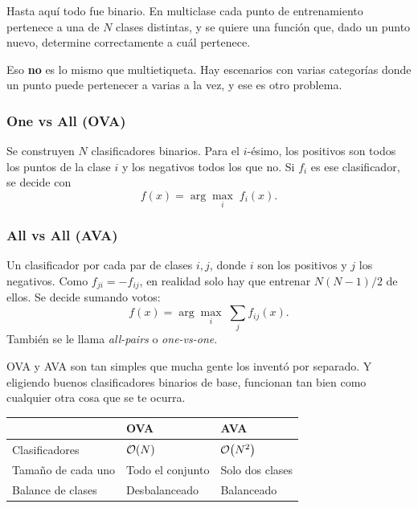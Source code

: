\documentclass[11pt,letterpaper]{article}
\begin{document}
Hasta aquí todo fue binario. En multiclase cada punto de entrenamiento
pertenece a una de $N$ clases distintas, y se quiere una función que,
dado un punto nuevo, determine correctamente a cuál pertenece.

\begin{ojo}
  Eso \textbf{no} es lo mismo que multietiqueta. Hay escenarios con
  varias categorías donde un punto puede pertenecer a varias a la vez,
  y ese es otro problema.
\end{ojo}

\subsubsection*{One vs All (OVA)}

Se construyen $N$ clasificadores binarios. Para el $i$-ésimo, los
positivos son todos los puntos de la clase $i$ y los negativos todos
los que no. Si $f_i$ es ese clasificador, se decide con
\[
    f(x) = \arg\max_{i} \; f_i(x) .
\]

\subsubsection*{All vs All (AVA)}

Un clasificador por cada par de clases $i, j$, donde $i$ son los
positivos y $j$ los negativos. Como $f_{ji} = -f_{ij}$, en realidad
solo hay que entrenar $N(N-1)/2$ de ellos. Se decide sumando votos:
\[
    f(x) = \arg\max_{i} \; \sum_{j} f_{ij}(x) .
\]
También se le llama \emph{all-pairs} o \emph{one-vs-one}.

\begin{idea}
  OVA y AVA son tan simples que mucha gente los inventó por separado.
  Y eligiendo buenos clasificadores binarios de base, funcionan tan
  bien como cualquier otra cosa que se te ocurra.
\end{idea}

\begin{center}
\begin{tabular}{lll}
    \toprule
     & \textbf{OVA} & \textbf{AVA} \\
    \midrule
    Clasificadores & $\mathcal{O}\!\left(N\right)$ & $\mathcal{O}\!\left(N^{2}\right)$ \\
    Tamaño de cada uno & Todo el conjunto & Solo dos clases \\
    Balance de clases & Desbalanceado & Balanceado \\
    \bottomrule
\end{tabular}
\end{center}
\end{document}
